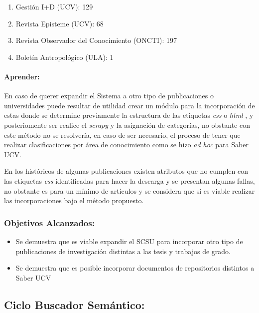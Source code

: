 \documentclass[
  12pt,
  openany]{book}
\begin{document}
\begin{enumerate}
\def\labelenumi{\arabic{enumi}.}
\item
  Gestión I+D (UCV): 129
\item
  Revista Episteme (UCV): 68
\item
  Revista Observador del Conocimiento (ONCTI): 197
\item
  Boletín Antropológico (ULA): 1
\end{enumerate}

\hypertarget{dcseisapre}{%
\paragraph{Aprender:}\label{dcseisapre}}

En caso de querer expandir el Sistema a otro tipo de publicaciones o universidades puede resultar de utilidad crear un módulo para la incorporación de estas donde se determine previamente la estructura de las etiquetas \emph{css} o \emph{html} , y posteriomente ser realice el \emph{scrapy} y la asignación de categorías, no obstante con este método no se resolvería, en caso de ser necesario, el proceso de tener que realizar clasificaciones por área de conocimiento como se hizo \emph{ad hoc} para Saber UCV.

En los históricos de algunas publicaciones existen atributos que no cumplen con las etiquetas \emph{css} identificadas para hacer la descarga y se presentan algunas fallas, no obstante es para un mínimo de artículos y se considera que sí es viable realizar las incorporaciones bajo el método propuesto.

\hypertarget{objetivos-alcanzados-3}{%
\subsubsection{Objetivos Alcanzados:}\label{objetivos-alcanzados-3}}

\begin{itemize}
\item
  Se demuestra que es viable expandir el SCSU para incorporar otro tipo de publicaciones de investigación distintas a las tesis y trabajos de grado.
\item
  Se demuestra que es posible incorporar documentos de repositorios distintos a Saber UCV
\end{itemize}

\newpage

\hypertarget{desasarrollociclos5}{%
\subsection{Ciclo Buscador Semántico:}\label{desasarrollociclos5}}
\end{document}
